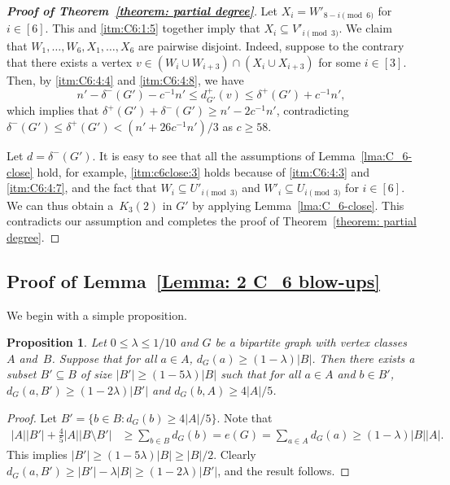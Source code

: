 \documentclass[11pt]{article}
\newtheorem{proposition}[theorem]{Proposition}
\numberwithin{equation}{section}
\begin{document}
\begin{proof}[\textbf{Proof of Theorem~\ref{theorem: partial degree}}]
        Let $X_i = W'_{8-i\pmod{6}}$ for $i\in [6]$. This and \ref{itm:C6:1:5} together imply that $X_i \subseteq V'_{i\pmod{3}}$.
         We claim that $W_1,\dots,W_6,X_1,\dots,X_6$ are pairwise disjoint. Indeed, suppose to the contrary that there exists a vertex $v\in \left(W_i\cup W_{i+3}\right)\cap (X_{i}\cup X_{i+3})$ for some $i\in [3]$. Then, by \ref{itm:C6:4:4} and \ref{itm:C6:4:8}, 
        we have $$n'-\delta^-(G')-c^{-1}n'\le d^+_{G'}(v)\le \delta^+(G')+c^{-1}n',$$ 
        which implies that $\delta^+(G')+\delta^-(G')\ge n'-2c^{-1}n'$, contradicting $\delta^-(G')\le \delta^+(G')< (n'+26c^{-1}n')/{3}$ as $c\ge 58$.


        Let $d=\delta^-(G')$. It is easy to see that all the assumptions of Lemma~\ref{lma:C_6-close} hold, for example,  \ref{itm:c6close:3} holds because of \ref{itm:C6:4:3} and \ref{itm:C6:4:7}, and the fact that $W_i\subseteq U'_{i\pmod{3}}$ and $W'_i\subseteq U_{i\pmod{3}}$ for $i\in [6]$.
        We can thus obtain a~$K_3(2)$ in $G'$ by applying Lemma~\ref{lma:C_6-close}. This contradicts our assumption and completes the proof of Theorem~\ref{theorem: partial degree}.
	\end{proof}
	
	
	\subsection{Proof of Lemma~\ref{Lemma: 2 C_6 blow-ups}}
	
	We begin with a simple proposition.
	\begin{proposition}\label{Proposition: A-B set}
		Let $0\leq \lambda\leq 1/{10}$ and $G$ be a bipartite graph with vertex classes $A$ and~$B$. Suppose that for all $a\in A$, $d_G(a)\geq (1-\lambda)|B|$. Then there exists a subset $B'\subseteq B$ of size $|B'|\geq (1-5\lambda)|B|$ such that for all $a\in A$ and $b\in B'$, $d_G(a,B')\geq (1-2\lambda)|B'|$ and $d_G(b,A)\geq 4|A|/5$.
	\end{proposition}
	
	
	\begin{proof}
		Let $B'=\{b\in B: d_G(b)\geq 4|A|/5\}$.
		Note that
		\begin{equation*}
			\begin{aligned}
				|A||B'|+\frac{4}{5}|A||B\setminus B'|&\geq \sum\limits_{b\in B}d_G(b)
				= e(G)
				=\sum\limits_{a\in A}d_G(a)
				\geq (1-\lambda)|B||A|.
			\end{aligned}
		\end{equation*}
		This implies $|B'|\geq (1-5\lambda)|B|\ge |B|/2$.
		Clearly $d_G(a,B')\geq |B'| - \lambda|B|\geq (1-2\lambda)|B'|$, and the result follows.
	\end{proof}
	
\end{document}

